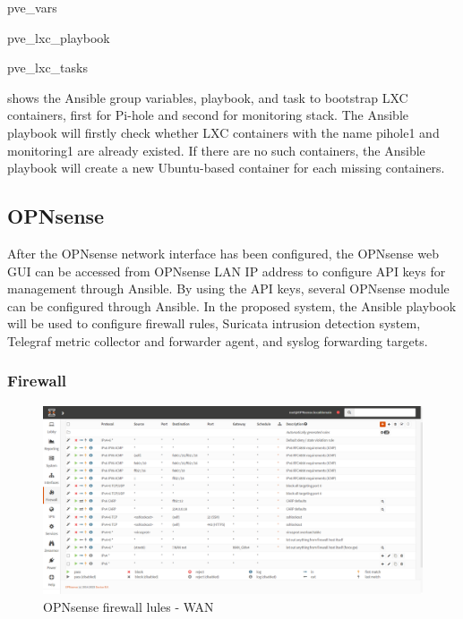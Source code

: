 \documentclass[../index.tex]{subfiles}
\begin{document}
{pve_vars}

{pve_lxc_playbook}

{pve_lxc_tasks}

 shows the Ansible group variables,
playbook, and task to bootstrap LXC containers, first for Pi-hole and second for monitoring stack.
The Ansible playbook will firstly check whether LXC containers with the name pihole1 and monitoring1
are already existed. If there are no such containers, the Ansible playbook will create a new
Ubuntu-based container for each missing containers.

\subsection{OPNsense}

After the OPNsense network interface has been configured, the OPNsense web GUI can be accessed from
OPNsense LAN IP address to configure API keys for management through Ansible. By using the API keys,
several OPNsense module can be configured through Ansible. In the proposed system, the Ansible
playbook will be used to configure firewall rules, Suricata intrusion detection system, Telegraf
metric collector and forwarder agent, and syslog forwarding targets. 

\subsubsection{Firewall}

\begin{figure}[h]
  \includegraphics[width=\textwidth]{../assets/opnsense_firewall_rule_2.png}
  \caption{OPNsense firewall lules - WAN}
  \label{fig:opnsense_rule}
\end{figure}
\end{document}
